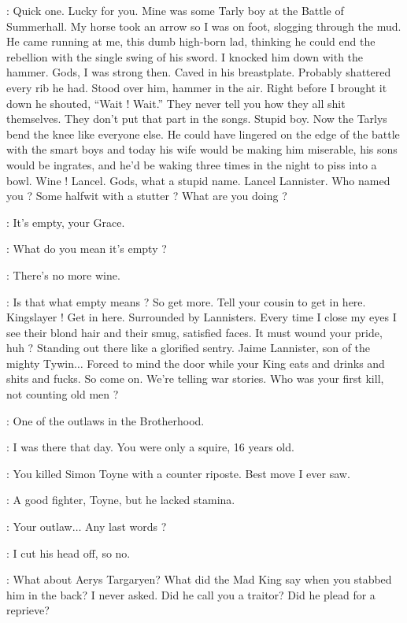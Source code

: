 \ROBERT: Quick one. Lucky for you. Mine was some Tarly boy at the Battle of Summerhall. My horse took an arrow so I was on foot, slogging through the mud. He came running at me, this dumb high-born lad, thinking he could end the rebellion with the single swing of his sword. I knocked him down with the hammer. Gods, I was strong then. Caved in his breastplate. Probably shattered every rib he had. Stood over him, hammer in the air. Right before I brought it down he shouted, ``Wait ! Wait.'' They never tell you how they all shit themselves. They don't put that part in the songs. Stupid boy. Now the Tarlys bend the knee like everyone else. He could have lingered on the edge of the battle with the smart boys and today his wife would be making him miserable, his sons would be ingrates, and he'd be waking three times in the night to piss into a bowl. Wine !  Lancel. Gods, what a stupid name. Lancel Lannister. Who named you ? Some halfwit with a stutter ? What are you doing ? 

\LANCEL: It's empty, your Grace. 

\ROBERT: What do you mean it's empty ? 

\LANCEL: There's no more wine. 

\ROBERT: Is that what empty means ? So get more.  Tell your cousin to get in here. Kingslayer ! Get in here.  Surrounded by Lannisters. Every time I close my eyes I see their blond hair and their smug, satisfied faces. It must wound your pride, huh ? Standing out there like a glorified sentry. Jaime Lannister, son of the mighty Tywin$\ldots$ Forced to mind the door while your King eats and drinks and shits and fucks. So come on. We're telling war stories. Who was your first kill, not counting old men ? 

\JAIME: One of the outlaws in the Brotherhood. 

\SELMY: I was there that day. You were only a squire, 16 years old. 

\JAIME: You killed Simon Toyne with a counter riposte. Best move I ever saw. 

\SELMY: A good fighter, Toyne, but he lacked stamina. 

\ROBERT: Your outlaw$\ldots$ Any last words ? 

\JAIME: I cut his head off, so no. 

\ROBERT: What about Aerys Targaryen? What did the Mad King say when you stabbed him in the back? I never asked. Did he call you a traitor? Did he plead for a reprieve? 

